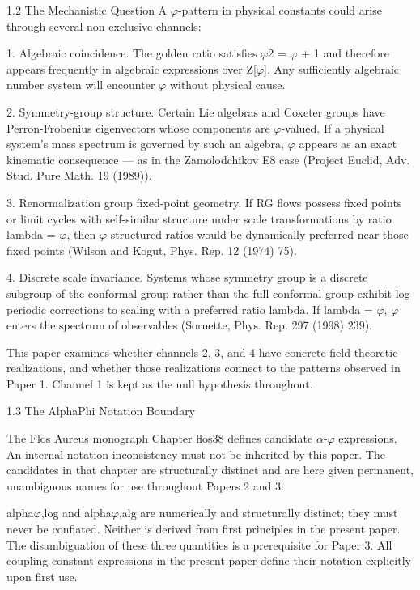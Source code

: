   1.2 The Mechanistic Question
  A $\varphi$-pattern in physical constants could arise through several non-exclusive channels:

  1. Algebraic coincidence. The golden ratio satisfies $\varphi$2 = $\varphi$ + 1 and therefore appears
  frequently in algebraic expressions over Z[$\varphi$]. Any sufficiently algebraic number system
  will encounter $\varphi$ without physical cause.

  2. Symmetry-group structure. Certain Lie algebras and Coxeter groups have
  Perron-Frobenius eigenvectors whose components are $\varphi$-valued. If a physical system's
  mass spectrum is governed by such an algebra, $\varphi$ appears as an exact kinematic
  consequence --- as in the Zamolodchikov E8 case (Project Euclid, Adv. Stud. Pure Math.
  19 (1989)).

  3. Renormalization group fixed-point geometry. If RG flows possess fixed points or limit
  cycles with self-similar structure under scale transformations by ratio lambda = $\varphi$, then
  $\varphi$-structured ratios would be dynamically preferred near those fixed points (Wilson and
  Kogut, Phys. Rep. 12 (1974) 75).

  4. Discrete scale invariance. Systems whose symmetry group is a discrete subgroup of
  the conformal group rather than the full conformal group exhibit log-periodic
  corrections to scaling with a preferred ratio lambda. If lambda = $\varphi$, $\varphi$ enters the
  spectrum of observables (Sornette, Phys. Rep. 297 (1998) 239).

  This paper examines whether channels 2, 3, and 4 have concrete field-theoretic
  realizations, and whether those realizations connect to the patterns observed in Paper
  1. Channel 1 is kept as the null hypothesis throughout.

  1.3 The AlphaPhi Notation Boundary

  The Flos Aureus monograph Chapter flos38 defines candidate $\alpha$-$\varphi$ expressions. An
  internal notation inconsistency must not be inherited by this paper. The candidates in
  that chapter are structurally distinct and are here given permanent, unambiguous
  names for use throughout Papers 2 and 3:

  alpha$\varphi$,log and alpha$\varphi$,alg are numerically and structurally distinct; they must never be
  conflated. Neither is derived from first principles in the present paper. The
  disambiguation of these three quantities is a prerequisite for Paper 3. All coupling
  constant expressions in the present paper define their notation explicitly upon first use.